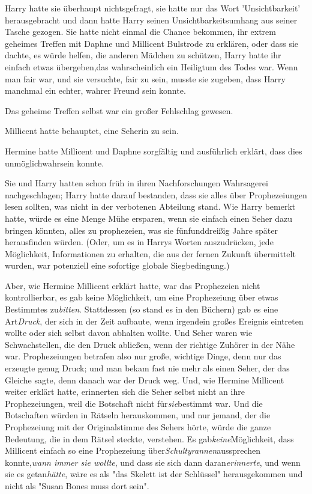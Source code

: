 {Harry hatte sie überhaupt nichtsgefragt, sie hatte nur das Wort 'Unsichtbarkeit' herausgebracht und dann hatte Harry seinen Unsichtbarkeitsumhang aus seiner Tasche gezogen. Sie hatte nicht einmal die Chance bekommen, ihr extrem geheimes Treffen mit Daphne und Millicent Bulstrode zu erklären, oder dass sie dachte, es würde helfen, die anderen Mädchen zu schützen, Harry hatte ihr einfach etwas übergeben,das wahrscheinlich ein Heiligtum des Todes war. Wenn man fair war, und sie versuchte, fair zu sein, musste sie zugeben, dass Harry manchmal ein echter, wahrer Freund sein konnte.

Das geheime Treffen selbst war ein großer Fehlschlag gewesen.

Millicent hatte behauptet, eine Seherin zu sein.

Hermine hatte Millicent und Daphne sorgfältig und ausführlich erklärt, dass dies unmöglichwahrsein konnte.

Sie und Harry hatten schon früh in ihren Nachforschungen Wahrsagerei nachgeschlagen; Harry hatte darauf bestanden, dass sie alles über Prophezeiungen lesen sollten, was nicht in der verbotenen Abteilung stand. Wie Harry bemerkt hatte, würde es eine Menge Mühe ersparen, wenn sie einfach einen Seher dazu bringen könnten, alles zu prophezeien, was sie fünfunddreißig Jahre später herausfinden würden. (Oder, um es in Harrys Worten auszudrücken, jede Möglichkeit, Informationen zu erhalten, die aus der fernen Zukunft übermittelt wurden, war potenziell eine sofortige globale Siegbedingung.)

Aber, wie Hermine Millicent erklärt hatte, war das Prophezeien nicht kontrollierbar, es gab keine Möglichkeit, um eine Prophezeiung über etwas Bestimmtes zu\emph{bitten}. Stattdessen (so stand es in den Büchern) gab es eine Art\emph{Druck}, der sich in der Zeit aufbaute, wenn irgendein großes Ereignis eintreten wollte oder sich selbst davon abhalten wollte. Und Seher waren wie Schwachstellen, die den Druck abließen, wenn der richtige Zuhörer in der Nähe war. Prophezeiungen betrafen also nur große, wichtige Dinge, denn nur das erzeugte genug Druck; und man bekam fast nie mehr als einen Seher, der das Gleiche sagte, denn danach war der Druck weg. Und, wie Hermine Millicent weiter erklärt hatte, erinnerten sich die Seher selbst nicht an ihre Prophezeiungen, weil die Botschaft nicht für\emph{sie}bestimmt war. Und die Botschaften würden in Rätseln herauskommen, und nur jemand, der die Prophezeiung mit der Originalstimme des Sehers hörte, würde die ganze Bedeutung, die in dem Rätsel steckte, verstehen. Es gab\emph{keine}Möglichkeit, dass Millicent einfach so eine Prophezeiung über\emph{Schultyrannen}aussprechen konnte,\emph{wann immer sie wollte}, und dass sie sich dann daran\emph{erinnerte}, und wenn sie es getan\emph{hätte}, wäre es als "das Skelett ist der Schlüssel" herausgekommen und nicht als "Susan Bones muss dort sein".

}
